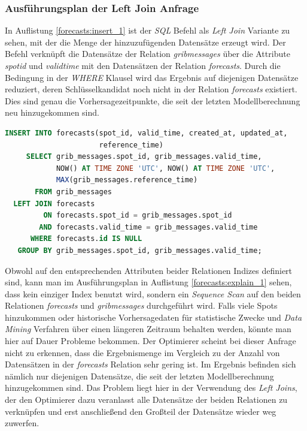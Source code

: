 \subsubsection{Ausführungsplan der Left Join Anfrage}
In Auflistung \ref{forecasts:insert_1} ist der \textit{SQL} Befehl als
\textit{Left Join} Variante zu sehen, mit der die Menge der
hinzuzufügenden Datensätze erzeugt wird. Der Befehl verknüpft die
Datensätze der Relation \textit{grib\textunderscore messages} über die
Attribute \textit{spot\textunderscore id} und
\textit{valid\textunderscore time} mit den Datensätzen der Relation
\textit{forecasts}. Durch die Bedingung in der \textit{WHERE} Klausel
wird das Ergebnis auf diejenigen Datensätze reduziert, deren
Schlüsselkandidat noch nicht in der Relation \textit{forecasts}
existiert. Dies sind genau die Vorhersagezeitpunkte, die seit der
letzten Modellberechnung neu hinzugekommen sind.

\begin{lstlisting}[captionpos=b, caption=Hinzufügen von Datensätze mittels Left Join, label=forecasts:insert_1, language=SQL]
INSERT INTO forecasts(spot_id, valid_time, created_at, updated_at, 
                      reference_time)
     SELECT grib_messages.spot_id, grib_messages.valid_time, 
            NOW() AT TIME ZONE 'UTC', NOW() AT TIME ZONE 'UTC', 
            MAX(grib_messages.reference_time)
       FROM grib_messages
  LEFT JOIN forecasts
         ON forecasts.spot_id = grib_messages.spot_id
        AND forecasts.valid_time = grib_messages.valid_time
      WHERE forecasts.id IS NULL
   GROUP BY grib_messages.spot_id, grib_messages.valid_time;
\end{lstlisting}

Obwohl auf den entsprechenden Attributen beider Relationen Indizes
definiert sind, kann man im Ausführungsplan in Auflistung
\ref{forecasts:explain_1} sehen, dass kein einziger Index benutzt
wird, sondern ein \textit{Sequence Scan} auf den beiden Relationen
\textit{forecasts} und \textit{grib\textunderscore messages}
durchgeführt wird. Falls viele Spots hinzukommen oder historische
Vorhersagedaten für statistische Zwecke und \textit{Data Mining}
Verfahren über einen längeren Zeitraum behalten werden, könnte man
hier auf Dauer Probleme bekommen. Der Optimierer scheint bei dieser
Anfrage nicht zu erkennen, dass die Ergebnismenge im Vergleich zu der
Anzahl von Datensätzen in der \textit{forecasts} Relation sehr gering
ist. Im Ergebnis befinden sich nämlich nur diejenigen Datensätze, die
seit der letzten Modellberechnung hinzugekommen sind. Das Problem
liegt hier in der Verwendung des \textit{Left Joins}, der den
Optimierer dazu veranlasst alle Datensätze der beiden Relationen zu
verknüpfen und erst anschließend den Großteil der Datensätze wieder
weg zuwerfen.

